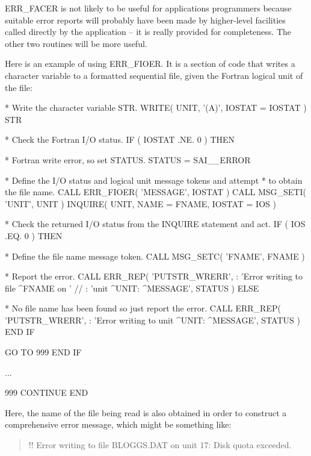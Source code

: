\documentclass[twoside,11pt]{starlink}
\begin{document}
ERR\_FACER is not likely to be useful for applications programmers because
suitable error reports will probably have been made by higher-level facilities
called directly by the application -- it is really provided for completeness.
The other two routines will be more useful.

Here is an example of using ERR\_FIOER.
It is a section of code that writes a character variable to a formatted
sequential file, given the Fortran logical unit of the file:

\begin {small}
\begin{terminalv}
*  Write the character variable STR.
      WRITE( UNIT, '(A)', IOSTAT = IOSTAT ) STR

*  Check the Fortran I/O status.
      IF ( IOSTAT .NE. 0 ) THEN

*     Fortran write error, so set STATUS.
         STATUS = SAI__ERROR

*     Define the I/O status and logical unit message tokens and attempt
*     to obtain the file name.
         CALL ERR_FIOER( 'MESSAGE', IOSTAT )
         CALL MSG_SETI( 'UNIT', UNIT )
         INQUIRE( UNIT, NAME = FNAME, IOSTAT = IOS )

*     Check the returned I/O status from the INQUIRE statement and act.
         IF ( IOS .EQ. 0 ) THEN

*        Define the file name message token.
            CALL MSG_SETC( 'FNAME', FNAME )

*        Report the error.
            CALL ERR_REP( 'PUTSTR_WRERR',
     :                'Error writing to file ^FNAME on ' //
     :                'unit ^UNIT: ^MESSAGE', STATUS )
         ELSE

*        No file name has been found so just report the error.
            CALL ERR_REP( 'PUTSTR_WRERR',
     :                'Error writing to unit ^UNIT: ^MESSAGE', STATUS )
         END IF

         GO TO 999
      END IF

      ...

 999  CONTINUE
      END
\end{terminalv}
\end {small}

Here, the name of the file being read is also obtained in order to construct
a comprehensive error message, which might be something like:

\begin {quote}
\begin {small}
\begin{terminalv}
!! Error writing to file BLOGGS.DAT on unit 17: Disk quota exceeded.
\end{terminalv}
\end {small}
\end {quote}
\end{document}
